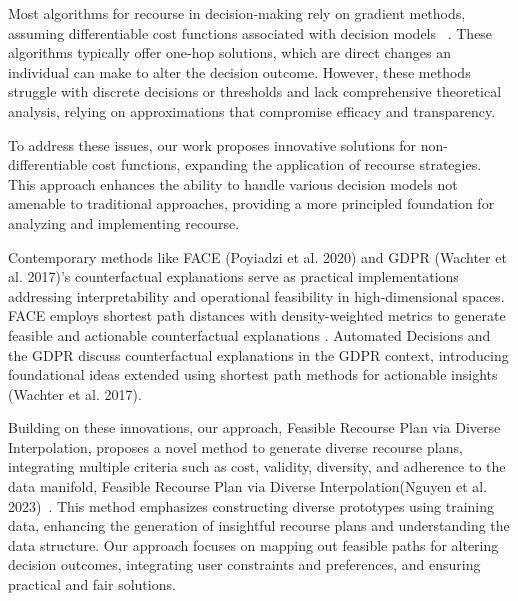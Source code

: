 Most algorithms for recourse in decision-making rely on gradient methods, assuming differentiable cost functions associated with decision models ~\cite{shao2022gradient}. These algorithms typically offer one-hop solutions, which are direct changes an individual can make to alter the decision outcome. However, these methods struggle with discrete decisions or thresholds and lack comprehensive theoretical analysis, relying on approximations that compromise efficacy and transparency.

To address these issues, our work proposes innovative solutions for non-differentiable cost functions, expanding the application of recourse strategies. This approach enhances the ability to handle various decision models not amenable to traditional approaches, providing a more principled foundation for analyzing and implementing recourse.

Contemporary methods like FACE (Poyiadzi et al. 2020)\cite{poyiadzi2020face} and GDPR (Wachter et al. 2017)\cite{wachter2017counterfactual}’s counterfactual explanations serve as practical implementations addressing interpretability and operational feasibility in high-dimensional spaces. FACE employs shortest path distances with density-weighted metrics to generate feasible and actionable counterfactual explanations \cite{poyiadzi2020face}. Automated Decisions and the GDPR discuss counterfactual explanations in the GDPR context, introducing foundational ideas extended using shortest path methods for actionable insights (Wachter et al. 2017)\cite{wachter2017counterfactual}.

Building on these innovations, our approach, Feasible Recourse Plan via Diverse Interpolation, proposes a novel method to generate diverse recourse plans, integrating multiple criteria such as cost, validity, diversity, and adherence to the data manifold, Feasible Recourse Plan via Diverse Interpolation(Nguyen et al. 2023)~\cite{nguyen2023feasible}. This method emphasizes constructing diverse prototypes using training data, enhancing the generation of insightful recourse plans and understanding the data structure. Our approach focuses on mapping out feasible paths for altering decision outcomes, integrating user constraints and preferences, and ensuring practical and fair solutions.